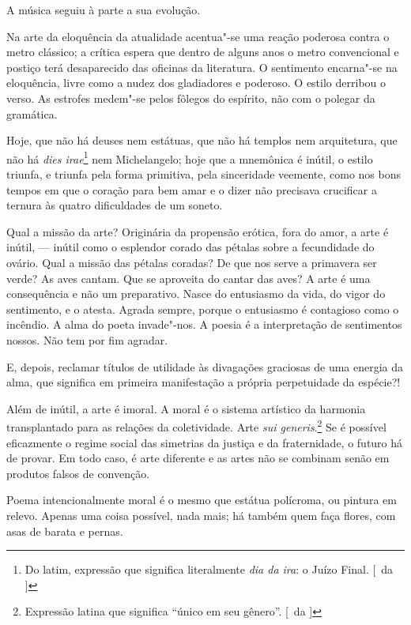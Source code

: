 A música seguiu à parte a sua evolução. 

Na arte da eloquência da atualidade acentua"-se uma reação poderosa contra o
metro clássico; a crítica espera que dentro de alguns anos o metro
convencional e postiço terá desaparecido das oficinas da literatura. O
sentimento encarna"-se na eloquência, livre como a nudez dos
gladiadores e poderoso. O estilo derribou o verso. As estrofes
medem"-se pelos fôlegos do espírito, não com o polegar da gramática.

Hoje, que não há deuses nem estátuas, que não há templos nem
arquitetura, que não há \textit{dies irae}\footnote{ Do latim, expressão que 
significa literalmente \textit{dia da ira}: o Juízo Final. [~da ]} 
nem Michelangelo; hoje que a
mnemônica é inútil, o estilo triunfa, e triunfa pela forma primitiva,
pela sinceridade veemente, como nos bons tempos em que o coração para
bem amar e o dizer não precisava crucificar a ternura às quatro
dificuldades de um soneto. 

Qual a missão da arte? Originária da
propensão erótica, fora do amor, a arte é inútil, --- inútil como o
esplendor corado das pétalas sobre a fecundidade do ovário. Qual a
missão das pétalas coradas? De que nos serve a primavera ser verde? As
aves cantam. Que se aproveita do cantar das aves? A arte é uma
consequência e não um preparativo. Nasce do entusiasmo da vida, do
vigor do sentimento, e o atesta. Agrada sempre, porque o entusiasmo é
contagioso como o incêndio. A alma do poeta invade"-nos. 
A poesia é a interpretação de sentimentos nossos. Não tem por fim
agradar. 

E, depois, reclamar títulos de utilidade às divagações
graciosas de uma energia da alma, que significa em primeira
manifestação a própria perpetuidade da espécie?! 

Além de inútil, a arte
é imoral. A moral é o sistema artístico da harmonia transplantado para
as relações da coletividade. Arte \textit{sui generis}.\footnote{ Expressão latina 
que significa ``único em seu gênero''. [~da ]} Se é possível
eficazmente o regime social das simetrias da justiça e da fraternidade,
o futuro há de provar. Em todo caso, é arte diferente e as artes não se
combinam senão em produtos falsos de convenção. 

Poema intencionalmente
moral é o mesmo que estátua polícroma, ou pintura em relevo. Apenas uma
coisa possível, nada mais; há também quem faça flores, com asas de
barata e pernas. 

